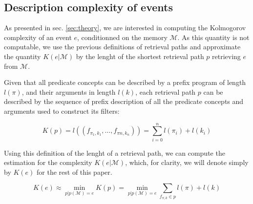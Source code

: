 \documentclass[conference]{IEEEtran}
\begin{document}
\subsection{Description complexity of events}


As presented in sec. \ref{sec:theory}, we are interested in computing the
Kolmogorov complexity of an event $e$, conditionned on the memory $\mathcal{M}$.
As this quantity is not computable, we use the previous definitions of retrieval
paths and approximate the quantity $K(e|\mathcal{M})$ by the lenght of the
shortest retrieval path $p$ retrieving $e$ from $\mathcal{M}$.

Given that all predicate concepts can be described by a prefix program of length
$l(\pi)$, and their arguments in length $l(k)$, each retrieval path $p$ can be
described by the sequence of prefix description of all the predicate concepts and
arguments used to construct its filters:

\begin{equation}
K(p) = l((f_{\pi_{1}, k_{1}}, \dots, f_{\pi{n}, k_{n}})) = \sum_{i=0}^{n} l(\pi_{i}) + l(k_{i})
\end{equation}

Using this definition of the lenght of a retrieval path, we can compute the
estimation for the complexity $K(e|\mathcal{M})$, which, for clarity, we will
denote simply by $K(e)$ for the rest of this paper.

\begin{equation}
  \label{eq:desc_k}
  K(e) \approx \min_{p | p(\mathcal{M}) = e} K(p) = \min_{p | p(\mathcal{M})=e} \sum_{f_{\pi, k} \in p} l(\pi) + l(k)
\end{equation}
\end{document}
